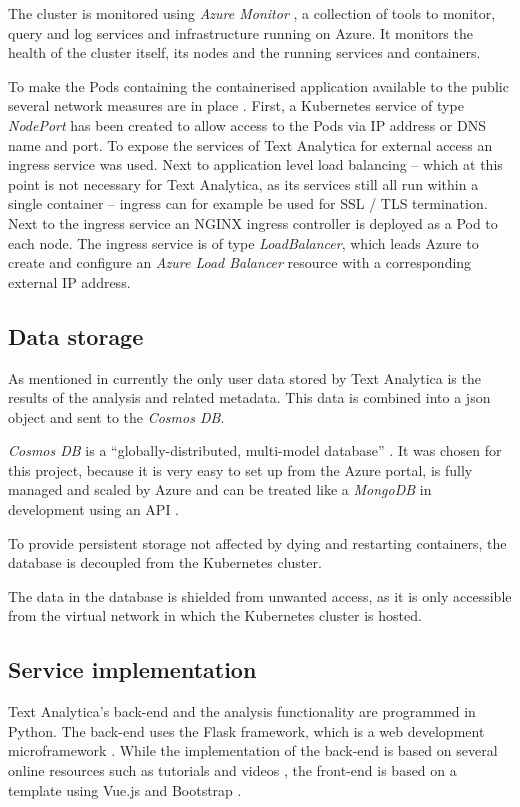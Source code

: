\documentclass[conference]{IEEEtran}
\begin{document}
The cluster is monitored using \textit{Azure Monitor} \cite{AzureMonitor}, a collection of tools to monitor, query and log services and infrastructure running on Azure. It monitors the health of the cluster itself, its nodes and the running services and containers.

To make the Pods containing the containerised application available to the public several network measures are in place \cite{AKSNetworks, AzureExposeKubernetesCluster}. First, a Kubernetes service of type \textit{NodePort} has been created to allow access to the Pods via IP address or DNS name and port. To expose the services of Text Analytica for external access an ingress service was used. Next to application level load balancing – which at this point is not necessary for Text Analytica, as its services still all run within a single container – ingress can for example be used for SSL / TLS termination. Next to the ingress service an NGINX ingress controller is deployed as a Pod to each node. The ingress service is of type \textit{LoadBalancer}, which leads Azure to create and configure an \textit{Azure Load Balancer} resource with a corresponding external IP address.

\subsection{Data storage}
As mentioned in  currently the only user data stored by Text Analytica is the results of the analysis and related metadata. This data is combined into a json object and sent to the \textit{Cosmos DB}.

\textit{Cosmos DB} is a “globally-distributed, multi-model database” \cite{CosmosDB}. It was chosen for this project, because it is very easy to set up from the Azure portal, is fully managed and scaled by Azure and can be treated like a \textit{MongoDB} in development using an API \cite{CosmosMongoDB}.

To provide persistent storage not affected by dying and restarting containers, the database is decoupled from the Kubernetes cluster.

The data in the database is shielded from unwanted access, as it is only accessible from the virtual network in which the Kubernetes cluster is hosted.

\subsection{Service implementation}
Text Analytica's back-end and the analysis functionality are programmed in Python. The back-end uses the Flask framework, which is a web development microframework \cite{Flask}. While the implementation of the back-end is based on several online resources such as tutorials and videos \cite{FlaskOnKubernetes, FlaskVue, FlaskMongo}, the front-end is based on a template using Vue.js and Bootstrap \cite{Bootstrap}.
\end{document}
